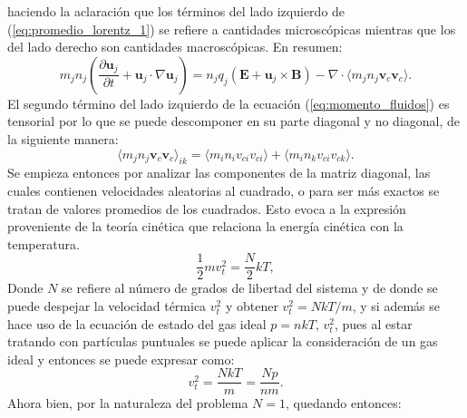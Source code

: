 \documentclass[../tesis_main_file.tex]{subfiles}
\begin{document}
haciendo la aclaración que los términos del lado izquierdo de (\ref{eq:promedio_lorentz_1}) se refiere a cantidades microscópicas mientras que los del lado derecho son cantidades macroscópicas.
En resumen:
\begin{equation}
\label{eq:momento_fluidos}
m_jn_j \left( \frac{\partial \textbf{u}_j}{\partial t}+\textbf{u}_j\cdot \nabla \textbf{u}_j \right)= n_jq_j(\textbf{E}+\textbf{u}_j\times \textbf{B})- \nabla \cdot \langle m_jn_j \textbf{v}_c \textbf{v}_c \rangle.
\end{equation}
El segundo término del lado izquierdo de la ecuación (\ref{eq:momento_fluidos}) es tensorial por lo que se puede descomponer en su parte diagonal y no diagonal, de la siguiente manera:
\begin{equation}
\langle m_j n_j \textbf{v}_c \textbf{v}_c \rangle _{ik}=\langle m_i n_iv_{ci}v_{ci}\rangle+ \langle m_i n_kv_{ci}v_{ck}\rangle.
\end{equation}
Se empieza entonces por analizar las componentes de la matriz diagonal,
las cuales contienen velocidades aleatorias al cuadrado, o para ser más exactos se tratan de valores promedios de los cuadrados. Esto evoca a la expresión proveniente de la teoría cinética que relaciona la energía cinética con la temperatura.
\begin{equation}
\frac{1}{2}mv_t^2=\frac{N}{2}kT,
\end{equation}
Donde $N$ se refiere al número de grados de libertad del sistema y de donde se puede despejar la velocidad térmica $v_t^2$ y obtener $v_t^2=NkT/m$, y si además se hace uso de la ecuación de estado del gas ideal $p=nkT$, $v^2_t$, pues al estar tratando con partículas puntuales se puede aplicar la consideración de un gas ideal y entonces se puede expresar como:
\begin{equation}
v_t^2=\frac{NkT}{m}=\frac{Np}{nm}.
\end{equation}
Ahora bien, por la naturaleza del problema $N=1$, quedando entonces:
\end{document}
